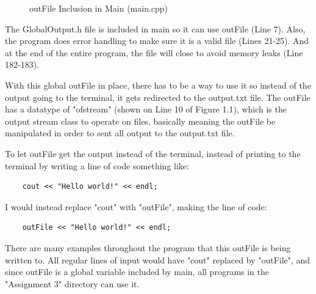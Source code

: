 \documentclass[letterpaper, 10pt]{article}
\begin{document}
\vspace{-1em}
\begin{figure}[H]
  \centering
  
  \label{fig:figure1.2-part1}
\end{figure}

\vspace{-3em}

\begin{figure}[H]
  \centering
  
  \label{fig:figure1.2-part2}
\end{figure}

\vspace{-3em}

\begin{figure}[H]
  \centering
  
  \caption{outFile Inclusion in Main (main.cpp)}
  \label{fig:figure1.2-part3}
\end{figure}

\noindent
The GlobalOutput.h file is included in main so it can use outFile (Line 7). Also, the program does error handling to make sure it is a valid file (Lines 21-25). And at the end of the entire program, the file will close to avoid memory leaks (Line 182-183).

\vspace{0.5em}

\noindent
With this global outFile in place, there has to be a way to use it so instead of the output going to the terminal, it gets redirected to the output.txt file. The outFile has a datatype of "ofstream" (shown on Line 10 of Figure 1.1), which is the output stream class to operate on files, basically meaning the outFile be manipulated in order to sent all output to the output.txt file. 

\vspace{0.5em}

\noindent
To let outFile get the output instead of the terminal, instead of printing to the terminal by writing a line of code something like:
\begin{verbatim}
    cout << "Hello world!" << endl;
\end{verbatim}
\noindent
I would instead replace "cout" with "outFile", making the line of code: 
\begin{verbatim}
    outFile << "Hello world!" << endl;
\end{verbatim}

\noindent
There are many examples throughout the program that this outFile is being written to. All regular lines of input would have "cout" replaced by "outFile", and since outFile is a global variable included by main, all programs in the "Assignment 3" directory can use it.
\end{document}
